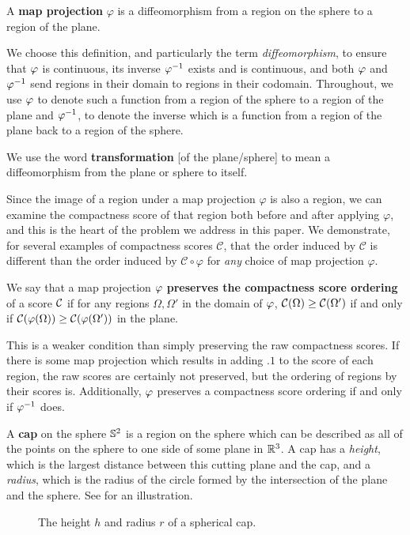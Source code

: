 \begin{definition}
  A \textbf{map projection} $\varphi$ is a 
  diffeomorphism from a region on the sphere to a region of the 
  plane. 
\end{definition}

We choose this definition, and particularly the term \textit{diffeomorphism}, to ensure that $\varphi$ is continuous, its inverse $\varphi^{-1}$ exists and is continuous, and both $\varphi$ and $\varphi^{-1}$ send regions in their domain to regions in their codomain.  Throughout, we use $\varphi$ to denote such a function from a region of the sphere 
to a region of the plane and $\varphi^{-1}$, to denote the inverse which is a function from a region of the plane back to a region of the sphere.

\begin{definition}
  We use the word \textbf{transformation} [of the plane/sphere] to mean
   a diffeomorphism from the plane or sphere to itself.
\end{definition}

Since the image of a region under a map projection $\varphi$ is also
a region, we can examine the compactness score of that region both 
before and after applying $\varphi$, and this is the heart of the
problem we address in this paper.  We demonstrate, for several
examples of compactness scores $\mathcal{C}$, that the order
induced by $\mathcal{C}$ is different than the order induced by
$\mathcal{C}\circ\varphi$ for \textit{any} choice of map projection
$\varphi$.

\begin{definition}
  We say that a map projection $\varphi$ \textbf{preserves the  
  compactness score ordering} of a score $\mathcal{C}$ if for any regions 
  $\Omega,\Omega'$ in the domain of $\varphi$, $\mathcal{C}(\Omega)\ge \mathcal{C}(\Omega')$ 
  if and only if $\mathcal{C}(\varphi(\Omega)) \ge \mathcal{C}(\varphi(\Omega'))$ in the plane.
\end{definition}

   This is a weaker condition than simply preserving the raw compactness scores. 
   If there is some map projection which results in adding $.1$ to the score of each region, the raw scores are certainly not preserved, but the ordering of regions by their scores is. Additionally, $\varphi$ preserves a compactness score ordering 
  if and only if $\varphi^{-1}$ does.



\begin{definition}
  A 
  \textbf{cap} on the sphere  $\mathbb{S}^2$ is a region on the sphere
 which can be described as all of the points on the sphere to one side of some plane 
 in $\mathbb{R}^3$.  A cap has a \textit{height}, which is the largest distance between this cutting plane and the cap, and a \textit{radius}, which is the radius of the circle formed by the intersection of the plane and the sphere.  See  for an illustration.
\end{definition}


\begin{figure}[h]
  \centering
  
  \caption{ The height $h$ and radius $r$ of a spherical cap. }
  \label{fig:caphr}
\end{figure}





